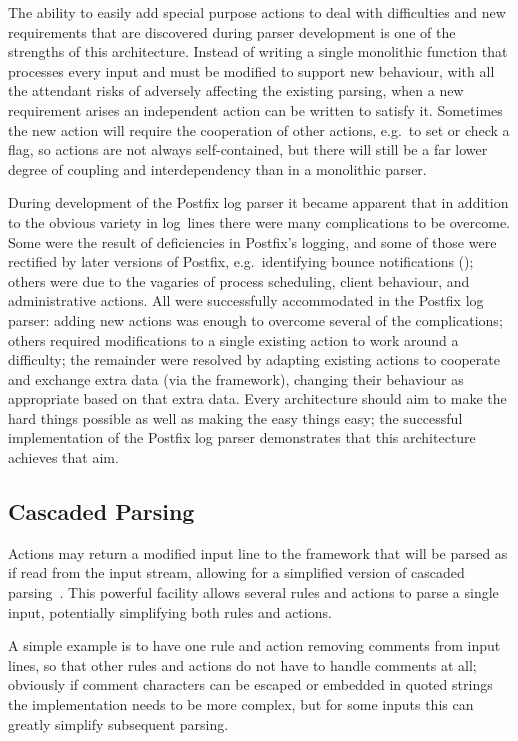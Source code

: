 The ability to easily add special purpose actions to deal with difficulties
and new requirements that are discovered during parser development is one
of the strengths of this architecture.  Instead of writing a single
monolithic function that processes every input and must be modified to
support new behaviour, with all the attendant risks of adversely affecting
the existing parsing, when a new requirement arises an independent action
can be written to satisfy it.  Sometimes the new action will require the
cooperation of other actions, e.g.\ to set or check a flag, so actions are
not always self-contained, but there will still be a far lower degree of
coupling and interdependency than in a monolithic parser.

During development of the Postfix log parser it became apparent that in
addition to the obvious variety in log~lines there were many complications
to be overcome.  Some were the result of deficiencies in Postfix's logging,
and some of those were rectified by later versions of Postfix, e.g.\
identifying bounce notifications
(); others were due to the
vagaries of process scheduling, client behaviour, and administrative
actions.  All were successfully accommodated in the Postfix log parser:
adding new actions was enough to overcome several of the complications;
others required modifications to a single existing action to work around a
difficulty; the remainder were resolved by adapting existing actions to
cooperate and exchange extra data (via the framework), changing their
behaviour as appropriate based on that extra data.  Every architecture
should aim to make the hard things possible as well as making the easy
things easy; the successful implementation of the Postfix log parser
demonstrates that this architecture achieves that aim.

\subsection{Cascaded Parsing}

\label{cascaded parsing}

Actions may return a modified input line to the framework that will be
parsed as if read from the input stream, allowing for a simplified version
of cascaded parsing~\cite{cascaded-parsing}.  This powerful facility allows
several rules and actions to parse a single input, potentially simplifying
both rules and actions.

A simple example is to have one rule and action removing comments from
input lines, so that other rules and actions do not have to handle comments
at all; obviously if comment characters can be escaped or embedded in
quoted strings the implementation needs to be more complex, but for some
inputs this can greatly simplify subsequent parsing.

